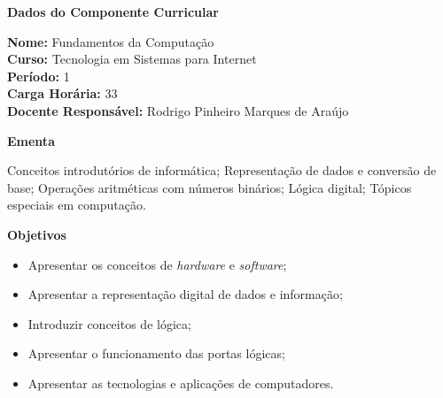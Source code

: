 

\begin{snugshade}\begin{center}\textbf{
    Dados do Componente Curricular
}\end{center}\end{snugshade}

\noindent \textbf{Nome:}                Fundamentos da Computa\c{c}\~ao
\\        \textbf{Curso:}               Tecnologia em Sistemas para Internet
\\        \textbf{Período:}             \unit{1}{\degree}
\\        \textbf{Carga Horária:}       \unit{33}{\hour}
\\        \textbf{Docente Responsável:} Rodrigo Pinheiro Marques de Araújo


\begin{snugshade}\begin{center}\textbf{
    Ementa
\vphantom{q}}\end{center}\end{snugshade}

\noindent
Conceitos introdut\'orios de inform\'atica; Representa\c{c}\~ao de dados e convers\~ao de base; Opera\c{c}\~oes aritm\'eticas com n\'umeros bin\'arios; L\'ogica digital; T\'opicos especiais em computa\c{c}\~ao.

\begin{snugshade}\begin{center}\textbf{
    Objetivos
}\end{center}\end{snugshade}

\begin{itemize}

\item Apresentar os conceitos de \textit{hardware} e \textit{software};
\item Apresentar a representação digital de dados e informação;
\item Introduzir conceitos de l\'ogica;
\item Apresentar o funcionamento das portas lógicas;
\item Apresentar as tecnologias e aplicações de computadores.

\end{itemize} 


